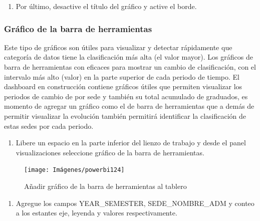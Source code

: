 \documentclass[
]{book}
\providecommand{\tightlist}{%
  \setlength{\itemsep}{0pt}\setlength{\parskip}{0pt}}
\begin{document}
\begin{enumerate}
\def\labelenumi{\arabic{enumi}.}
\setcounter{enumi}{6}
\tightlist
\item
  Por último, desactive el título del gráfico y active el borde.
\end{enumerate}

\hypertarget{gruxe1fico-de-la-barra-de-herramientas}{%
\subsubsection{Gráfico de la barra de herramientas}\label{gruxe1fico-de-la-barra-de-herramientas}}

Este tipo de gráficos son útiles para visualizar y detectar rápidamente que categoría de datos tiene la clasificación más alta (el valor mayor). Los gráficos de barra de herramientas con eficaces para mostrar un cambio de clasificación, con el intervalo más alto (valor) en la parte superior de cada periodo de tiempo.
El dashboard en construcción contiene gráficos útiles que permiten visualizar los periodos de cambio de por sede y también su total acumulado de graduados, es momento de agregar un gráfico como el de barra de herramientas que a demás de permitir visualizar la evolución también permitirá identificar la clasificación de estas sedes por cada periodo.

\begin{enumerate}
\def\labelenumi{\arabic{enumi}.}
\tightlist
\item
  Libere un espacio en la parte inferior del lienzo de trabajo y desde el panel visualizaciones seleccione gráfico de la barra de herramientas.
\end{enumerate}

\begin{figure}

{\centering \texttt{[image: Imágenes/powerbi124]} 

}

\caption{Añadir gráfico de la barra de herramientas al tablero}\label{fig:paso1graficobarradeherramientas-fig}
\end{figure}

\begin{enumerate}
\def\labelenumi{\arabic{enumi}.}
\setcounter{enumi}{1}
\tightlist
\item
  Agregue los campos YEAR\_SEMESTER, SEDE\_NOMBRE\_ADM y conteo a los estantes eje, leyenda y valores respectivamente.
\end{enumerate}
\end{document}
